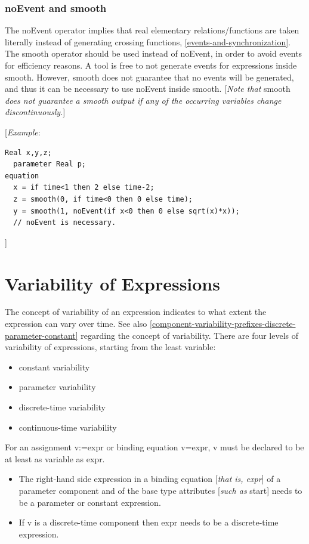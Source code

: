 \documentclass[10pt,a4paper]{report}
\def\doublelabel#1{\label{#1}}
\begin{document}
\subsubsection{noEvent and smooth}\doublelabel{noevent-and-smooth}

The noEvent operator implies that real elementary relations/functions
are taken literally instead of generating crossing functions, \ref{events-and-synchronization}. 
The smooth operator should be used instead of noEvent, in order to
avoid events for efficiency reasons. A tool is free to not generate
events for expressions inside smooth. However, smooth does not guarantee
that no events will be generated, and thus it can be necessary to use
noEvent inside smooth. {[}\emph{Note that} smooth \emph{does not
guarantee a smooth output if any of the occurring variables change
discontinuously.}{]}

{[}\emph{Example}:
\begin{lstlisting}[language=modelica]
  Real x,y,z;
  parameter Real p;
equation
  x = if time<1 then 2 else time-2;
  z = smooth(0, if time<0 then 0 else time);
  y = smooth(1, noEvent(if x<0 then 0 else sqrt(x)*x));
  // noEvent is necessary.
\end{lstlisting}

{]}

\section{Variability of Expressions}\doublelabel{variability-of-expressions}

The concept of variability of an expression indicates to what extent the
expression can vary over time. See also \ref{component-variability-prefixes-discrete-parameter-constant} regarding the
concept of variability. There are four levels of variability of
expressions, starting from the least variable:

\begin{itemize}
\item
  constant variability
\item
  parameter variability
\item
  discrete-time variability
\item
  continuous-time variability
\end{itemize}

For an assignment v:=expr or binding equation v=expr, v must be declared
to be at least as variable as expr.

\begin{itemize}
\item
  The right-hand side expression in a binding equation {[}\emph{that is,
  expr}{]} of a parameter component and of the base type attributes
  {[}\emph{such as} start{]} needs to be a parameter or constant
  expression.
\item
  If v is a discrete-time component then expr needs to be a
  discrete-time expression.
\end{itemize}
\end{document}
